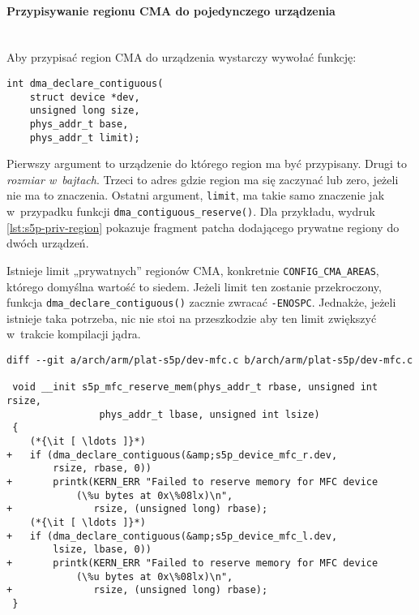 \paragraph{Przypisywanie regionu CMA do pojedynczego urządzenia} \hspace{0pt} \\

Aby przypisać region CMA do urządzenia wystarczy wywołać funkcję:

\begin{lstlisting}
int dma_declare_contiguous(
	struct device *dev,
	unsigned long size,
	phys_addr_t base,
	phys_addr_t limit);
\end{lstlisting}

Pierwszy argument to urządzenie do którego region ma być przypisany.
Drugi to \emph{rozmiar w~bajtach}.  Trzeci to adres gdzie region ma
się zaczynać lub zero, jeżeli nie ma to znaczenia.  Ostatni argument,
\lstinline|limit|, ma takie samo znaczenie jak w~przypadku funkcji
\lstinline|dma_contiguous_reserve()|.  Dla przykładu, wydruk
\ref{lst:s5p-priv-region} pokazuje fragment patcha dodającego prywatne
regiony do dwóch urządzeń.

Istnieje limit „prywatnych” regionów CMA, konkretnie
\lstinline|CONFIG_CMA_AREAS|, którego domyślna wartość to siedem.
Jeżeli limit ten zostanie przekroczony, funkcja
\lstinline|dma_declare_contiguous()| zacznie zwracać
\lstinline|-ENOSPC|.  Jednakże, jeżeli istnieje taka potrzeba, nic nie
stoi na przeszkodzie aby ten limit zwiększyć w~trakcie kompilacji
jądra.

\begin{lstlisting}[float=tbhp,caption={Przypisanie prywatnych regionów
      CMA do dwóch urządzeń.},label=lst:s5p-priv-region]
diff --git a/arch/arm/plat-s5p/dev-mfc.c b/arch/arm/plat-s5p/dev-mfc.c

 void __init s5p_mfc_reserve_mem(phys_addr_t rbase, unsigned int rsize,
 				phys_addr_t lbase, unsigned int lsize)
 {
	(*{\it [ \ldots ]}*)
+	if (dma_declare_contiguous(&amp;s5p_device_mfc_r.dev,
		rsize, rbase, 0))
+		printk(KERN_ERR "Failed to reserve memory for MFC device
			(\%u bytes at 0x\%08lx)\n",
+		       rsize, (unsigned long) rbase);
	(*{\it [ \ldots ]}*)
+	if (dma_declare_contiguous(&amp;s5p_device_mfc_l.dev,
		lsize, lbase, 0))
+		printk(KERN_ERR "Failed to reserve memory for MFC device
			(\%u bytes at 0x\%08lx)\n",
+		       rsize, (unsigned long) rbase);
 }
\end{lstlisting}

